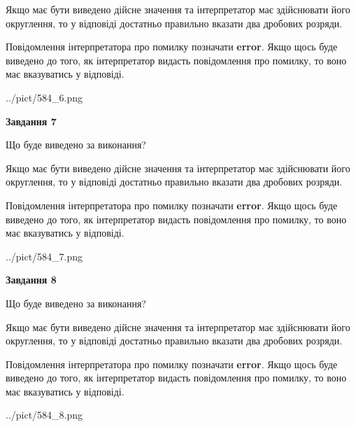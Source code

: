 \documentclass[12pt, ukrainian]{article}
\begin{document}
{\begin {Large}
Якщо має бути виведено дійсне значення та інтерпретатор має здійснювати його округлення, 
то у відповіді достатньо правильно вказати два дробових розряди.

Повідомлення інтерпретатора про помилку позначати \textbf{error}.
Якщо щось буде виведено до того, як інтерпретатор видасть повідомлення про помилку, 
то воно має вказуватись у відповіді. \par

\begin{center}
	{../pict/584_6.png}
\end{center}
\newpage

{\begin {center}\textbf{Завдання 7}\end {center}}\par
Що буде виведено за виконання? \par

Якщо має бути виведено дійсне значення та інтерпретатор має здійснювати його округлення, 
то у відповіді достатньо правильно вказати два дробових розряди.

Повідомлення інтерпретатора про помилку позначати \textbf{error}.
Якщо щось буде виведено до того, як інтерпретатор видасть повідомлення про помилку, 
то воно має вказуватись у відповіді. \par

\begin{center}
	{../pict/584_7.png}
\end{center}
\newpage

{\begin {center}\textbf{Завдання 8}\end {center}}\par
Що буде виведено за виконання? \par

Якщо має бути виведено дійсне значення та інтерпретатор має здійснювати його округлення, 
то у відповіді достатньо правильно вказати два дробових розряди.

Повідомлення інтерпретатора про помилку позначати \textbf{error}.
Якщо щось буде виведено до того, як інтерпретатор видасть повідомлення про помилку, 
то воно має вказуватись у відповіді. \par

\begin{center}
	{../pict/584_8.png}
\end{center}
\newpage


\end{Large}}
\end{document}
